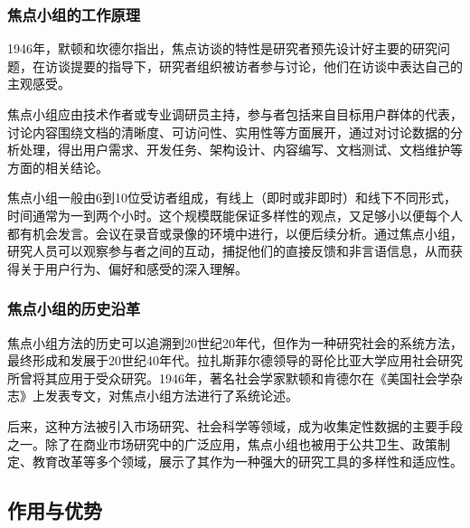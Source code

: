 \documentclass[letterpaper,10pt,english]{sphinxmanual}
\begin{document}
\subsubsection{焦点小组的工作原理}
\label{\detokenize{user-research/focus-group:id5}}
\sphinxAtStartPar
1946年，默顿和坎德尔指出，焦点访谈的特性是研究者预先设计好主要的研究问题，在访谈提要的指导下，研究者组织被访者参与讨论，他们在访谈中表达自己的主观感受。

\sphinxAtStartPar
焦点小组应由技术作者或专业调研员主持，参与者包括来自目标用户群体的代表，讨论内容围绕文档的清晰度、可访问性、实用性等方面展开，通过对讨论数据的分析处理，得出用户需求、开发任务、架构设计、内容编写、文档测试、文档维护等方面的相关结论。

\sphinxAtStartPar
焦点小组一般由6到10位受访者组成，有线上（即时或非即时）和线下不同形式，时间通常为一到两个小时。这个规模既能保证多样性的观点，又足够小以便每个人都有机会发言。会议在录音或录像的环境中进行，以便后续分析。通过焦点小组，研究人员可以观察参与者之间的互动，捕捉他们的直接反馈和非言语信息，从而获得关于用户行为、偏好和感受的深入理解。


\subsubsection{焦点小组的历史沿革}
\label{\detokenize{user-research/focus-group:id6}}
\sphinxAtStartPar
焦点小组方法的历史可以追溯到20世纪20年代，但作为一种研究社会的系统方法，最终形成和发展于20世纪40年代。拉扎斯菲尔德领导的哥伦比亚大学应用社会研究所曾将其应用于受众研究。1946年，著名社会学家默顿和肯德尔在《美国社会学杂志》上发表专文，对焦点小组方法进行了系统论述。

\sphinxAtStartPar
后来，这种方法被引入市场研究、社会科学等领域，成为收集定性数据的主要手段之一。除了在商业市场研究中的广泛应用，焦点小组也被用于公共卫生、政策制定、教育改革等多个领域，展示了其作为一种强大的研究工具的多样性和适应性。


\subsection{作用与优势}
\label{\detokenize{user-research/focus-group:id7}}
\end{document}
